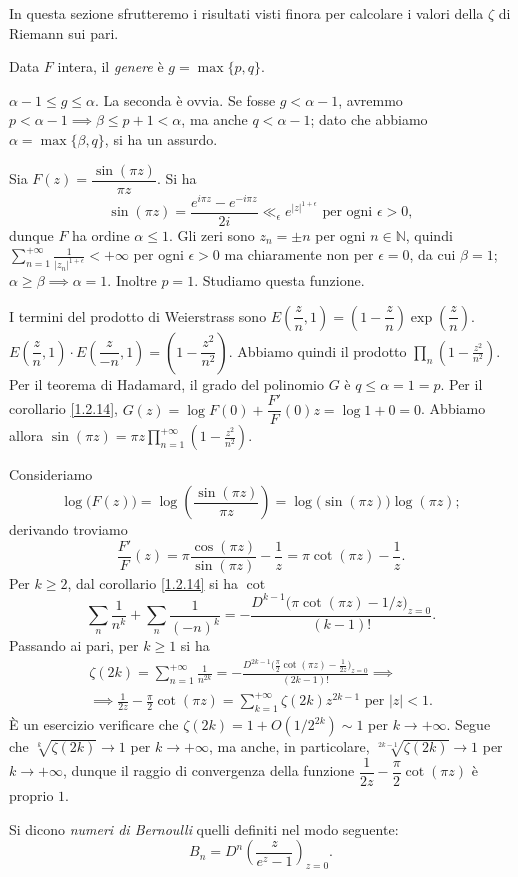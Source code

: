 In questa sezione sfrutteremo i risultati visti finora per calcolare i valori della $\zeta$ di Riemann sui pari.

\begin{defn}
  Data $F$ intera, il \textit{genere} è $g=\max\{p,q\}$.
\end{defn}

\begin{oss}
  $\alpha-1 \le g \le \alpha$. La seconda è ovvia. Se fosse $g<\alpha-1$, avremmo $p<\alpha-1 \implies \beta \le p+1<\alpha$, ma anche $q<\alpha-1$; dato che abbiamo $\alpha=\max\{\beta,q\}$, si ha un assurdo.
\end{oss}

\begin{ex}
  Sia $F(z)=\dfrac{\sin(\pi z)}{\pi z}$. Si ha
  $$\sin(\pi z)=\frac{e^{i\pi z}-e^{-i\pi z}}{2i} \ll_{\epsilon} e^{|z|^{1+\epsilon}} \text{ per ogni } \epsilon>0,$$
  dunque $F$ ha ordine $\alpha \le 1$. Gli zeri sono $z_n=\pm n$ per ogni $n \in \mathbb{N}$, quindi $\displaystyle \sum_{n=1}^{+\infty} \frac{1}{|z_n|^{1+\epsilon}}<+\infty$ per ogni $\epsilon>0$ ma chiaramente non per $\epsilon=0$, da cui $\beta=1$;
  $\alpha \ge \beta \implies \alpha=1$. Inoltre $p=1$. Studiamo questa funzione.
\end{ex}

I termini del prodotto di Weierstrass sono $E\left(\dfrac{z}{n},1\right)=\left(1-\dfrac{z}{n}\right)\exp\left(\dfrac{z}{n}\right)$. $E\left(\dfrac{z}{n},1\right) \cdot E\left(\dfrac{z}{-n},1\right)=\left(1-\dfrac{z^2}{n^2}\right)$.
Abbiamo quindi il prodotto $\displaystyle \prod_n \left(1-\frac{z^2}{n^2}\right)$. Per il teorema di Hadamard, il grado del polinomio $G$ è $q \le \alpha=1=p$. Per il corollario \ref{1.2.14}, $G(z)=\log{F(0)}+\dfrac{F'}{F}(0)z=\log{1}+0=0$.
Abbiamo allora $\displaystyle \sin(\pi z)=\pi z\prod_{n=1}^{+\infty} \left(1-\frac{z^2}{n^2}\right)$.

Consideriamo
$$\log\big(F(z)\big)=\log\left(\frac{\sin(\pi z)}{\pi z}\right)=\log\big(\sin(\pi z)\big)\log(\pi z);$$
derivando troviamo
$$\frac{F'}{F}(z)=\pi\frac{\cos(\pi z)}{\sin(\pi z)}-\frac{1}{z}=\pi\cot(\pi z)-\frac{1}{z}.$$
Per $k \ge 2$, dal corollario \ref{1.2.14} si ha $\cot$
$$\sum_n \frac{1}{n^k}+\sum_n \frac{1}{(-n)^k}=-\frac{D^{k-1}\big(\pi\cot(\pi z)-1/z\big)_{z=0}}{(k-1)!}.$$
Passando ai pari, per $k \ge 1$ si ha
\begin{gather*}
  \zeta(2k)=\sum_{n=1}^{+\infty} \frac{1}{n^{2k}}=-\frac{D^{2k-1}\big(\frac{\pi}{2}\cot(\pi z)-\frac{1}{2z}\big)_{z=0}}{(2k-1)!} \implies \\
  \implies \frac{1}{2z}-\frac{\pi}{2}\cot(\pi z)=\sum_{k=1}^{+\infty} \zeta(2k)z^{2k-1} \text{ per } |z|<1.
\end{gather*}
È un esercizio verificare che $\zeta(2k)=1+O(1/2^{2k}) \sim 1$ per $k \longrightarrow +\infty$. Segue che $\sqrt[k]{\zeta(2k)} \longrightarrow 1$ per $k \longrightarrow +\infty$, ma anche, in particolare, $\sqrt[2k-1]{\zeta(2k)} \longrightarrow 1$ per $k \longrightarrow +\infty$, dunque il raggio di convergenza della funzione $\dfrac{1}{2z}-\dfrac{\pi}{2}\cot(\pi z)$ è proprio $1$.

\begin{defn}
  Si dicono \textit{numeri di Bernoulli} quelli definiti nel modo seguente:
  $$B_n=D^n\left(\frac{z}{e^z-1}\right)_{z=0}.$$
\end{defn}
